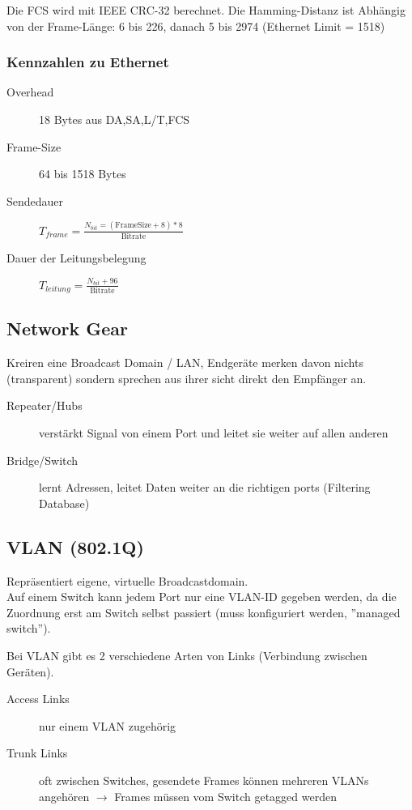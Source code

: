 Die FCS wird mit IEEE CRC-32 berechnet. Die Hamming-Distanz ist Abhängig von der
Frame-Länge: 6 bis 226, danach 5 bis 2974 (Ethernet Limit = 1518)

\subsubsection{Kennzahlen zu Ethernet}
\begin{description}
	\item[Overhead] 18 Bytes aus DA,SA,L/T,FCS
	\item[Frame-Size] 64 bis 1518 Bytes
	\item[Sendedauer] $T_{frame} =
			\frac{N_{bit} = (\text{FrameSize} + 8) * 8}{\text{Bitrate}}$
	\item[Dauer der Leitungsbelegung] $T_{leitung}
			= \frac{N_{bit} + 96}{\text{Bitrate}}$
\end{description}





\subsection{Network Gear}

Kreiren eine Broadcast Domain / LAN, Endgeräte merken davon nichts (transparent)
sondern sprechen aus ihrer sicht direkt den Empfänger an.

\begin{description}
	\item[Repeater/Hubs] verstärkt Signal von einem Port und leitet sie weiter
		auf allen anderen
	\item[Bridge/Switch] lernt Adressen, leitet Daten weiter an
		die richtigen ports (Filtering Database)
\end{description}



\subsection{VLAN (802.1Q)}

Repräsentiert eigene, virtuelle Broadcastdomain. \\
Auf einem Switch kann jedem Port nur eine VLAN-ID gegeben werden, da die Zuordnung
erst am Switch selbst passiert (muss konfiguriert werden, ''managed switch'').

Bei VLAN gibt es 2 verschiedene Arten von Links (Verbindung zwischen Geräten).
\begin{description}
	\item[Access Links] nur einem VLAN zugehörig
	\item[Trunk Links] oft zwischen Switches, gesendete Frames können mehreren VLANs
		angehören $\rightarrow$ Frames müssen vom Switch getagged werden
\end{description}

